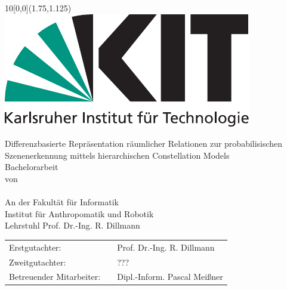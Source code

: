 \newcommand{\diameter}{20}
\newcommand{\xone}{-50}
\newcommand{\xtwo}{450}
\newcommand{\yone}{60}
\newcommand{\ytwo}{-700}

\newcommand{\timestart}{11. Juni 2017}
\newcommand{\timeend}{10. September 2017}
\newcommand{\submissiontime}{DD. MM. 20XX}

\begin{titlepage}

  \begin{textblock}{10}[0,0](1.75,1.125)
    \includegraphics[width=.3\textwidth]{bilder/Kitlogo_de_rgb.pdf}
  \end{textblock}

  \vspace*{3.5cm}
  \begin{center}
    \Huge{Differenzbasierte Repräsentation räumlicher Relationen zur probabilisischen Szenenerkennung mittels hierarchischen Constellation Models}\\
    \vspace*{2cm}
    \Large{Bachelorarbeit\\von}\\
    \vspace*{1cm}
    \huge{\myname}\\
    \vspace*{1cm}
    \Large{An der Fakultät für Informatik\\Institut für Anthropomatik und Robotik\\Lehrstuhl Prof. Dr.-Ing. R. Dillmann}
  \end{center}

  \vspace*{1cm}
  \Large{
    \begin{center}
      \begin{tabular}[ht]{l c l}
        Erstgutachter: & \hfill  & Prof. Dr.-Ing. R. Dillmann\\
        Zweitgutachter: & \hfill  & ???\\
        Betreuender Mitarbeiter: & \hfill  & Dipl.-Inform. Pascal Meißner\\
      \end{tabular}
    \end{center}
  }


\end{titlepage}
